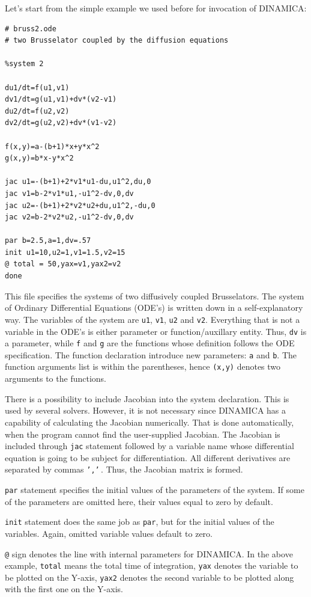 \documentclass[11pt,a4paper]{article}
\begin{document}
Let's start from the simple example we used before for invocation of
DINAMICA:
\begin{verbatim}
# bruss2.ode
# two Brusselator coupled by the diffusion equations

%system 2

du1/dt=f(u1,v1)
dv1/dt=g(u1,v1)+dv*(v2-v1)
du2/dt=f(u2,v2)
dv2/dt=g(u2,v2)+dv*(v1-v2)

f(x,y)=a-(b+1)*x+y*x^2
g(x,y)=b*x-y*x^2

jac u1=-(b+1)+2*v1*u1-du,u1^2,du,0
jac v1=b-2*v1*u1,-u1^2-dv,0,dv
jac u2=-(b+1)+2*v2*u2+du,u1^2,-du,0
jac v2=b-2*v2*u2,-u1^2-dv,0,dv

par b=2.5,a=1,dv=.57
init u1=10,u2=1,v1=1.5,v2=15
@ total = 50,yax=v1,yax2=v2
done
\end{verbatim}
This file specifies the systems of two diffusively coupled Brusselators. The system
of Ordinary Differential Equations (ODE's) is written down in a self-explanatory
way. The variables of the system are \texttt{u1}, \texttt{v1}, \texttt{u2} and
\texttt{v2}. Everything that is not a variable in the ODE's is either parameter or
function/auxillary entity. Thus, \texttt{dv} is a parameter, while \texttt{f} and
\texttt{g} are the functions whose definition follows the ODE specification. The
function declaration introduce new parameters: \texttt{a} and \texttt{b}. The
function arguments list is within the parentheses, hence \texttt{(x,y)} denotes two
arguments to the functions.

There is a possibility to include Jacobian into the system declaration. This is used
by several solvers. However, it is not necessary since DINAMICA has a capability of
calculating the Jacobian numerically. That is done automatically, when the program
cannot find the user-supplied Jacobian. The Jacobian is included through \texttt{jac}
statement followed by a variable name whose differential equation is going to be
subject for differentiation. All different derivatives are separated by commas
\texttt{','}\,. Thus, the Jacobian matrix is formed.

\texttt{par} statement specifies the initial values of the parameters of the
system. If some of the parameters are omitted here, their values equal to zero by
default.

\texttt{init} statement does the same job as \texttt{par}, but for the initial values
of the variables. Again, omitted variable values default to zero.

\texttt{@} sign denotes the line with internal parameters for DINAMICA. In the above
example, \texttt{total} means the total time of integration, \texttt{yax} denotes the
variable to be plotted on the Y-axis, \texttt{yax2} denotes the second variable to be
plotted along with the first one on the Y-axis.
\end{document}
